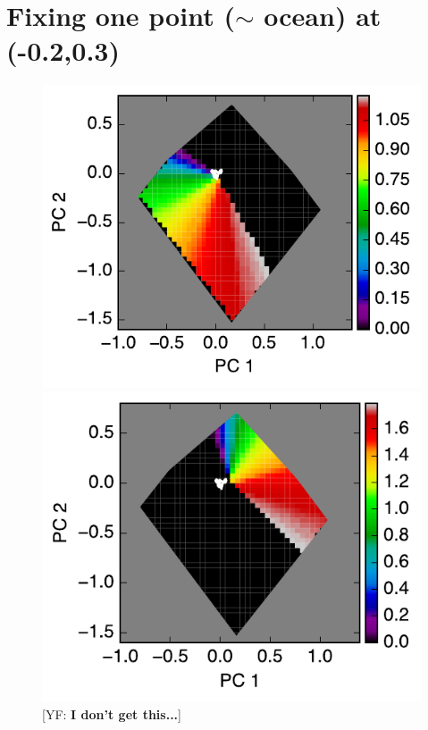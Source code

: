 \documentclass[iop,numberedappendix,apj,]{emulateapj}
\def\memoYF#1{\color{red}[YF: {\bf #1}]\color{black}}
\begin{document}
\newpage

\section{Fixing one point ($\sim $ ocean) at (-0.2,0.3) }



\begin{figure}[tbh!]
   \begin{minipage}{0.33\hsize}
    \begin{center}
	\includegraphics[width=\hsize]{raddata_2_norm_noreg_fixedocean_1.pdf}
    \end{center}	
   \end{minipage}
   \begin{minipage}{0.33\hsize}
    \begin{center}
	\includegraphics[width=\hsize]{raddata_2_norm_noreg_fixedocean_2.pdf}
    \end{center}	
   \end{minipage}
   \caption{\memoYF{I don't get this...}}
\end{figure}
\end{document}

